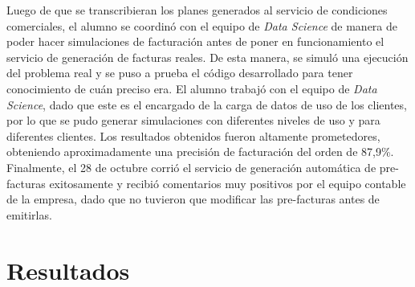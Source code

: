     Luego de que se transcribieran los planes generados al servicio de condiciones comerciales, el alumno se coordinó con el equipo de \textit{Data Science} de manera de poder hacer simulaciones de facturación antes de poner en funcionamiento el servicio de generación de facturas reales. De esta manera, se simuló una ejecución del problema real y se puso a prueba el código desarrollado para tener conocimiento de cuán preciso era. El alumno trabajó con el equipo de \textit{Data Science}, dado que este es el encargado de la carga de datos de uso de los clientes, por lo que se pudo generar simulaciones con diferentes niveles de uso y para diferentes clientes. Los resultados obtenidos fueron altamente prometedores, obteniendo aproximadamente una precisión de facturación del orden de 87,9\%. Finalmente, el 28 de octubre corrió el servicio de generación automática de pre-facturas exitosamente y recibió comentarios muy positivos por el equipo contable de la empresa, dado que no tuvieron que modificar las pre-facturas antes de emitirlas.


\section{Resultados}